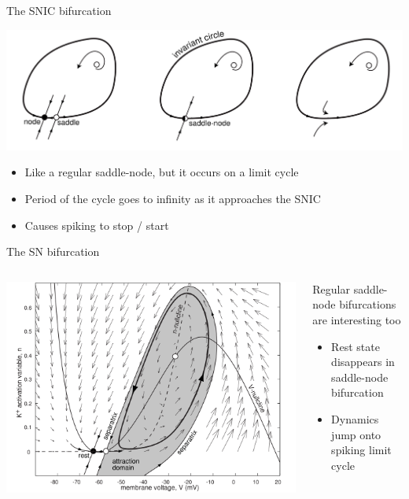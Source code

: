 \documentclass[presentation]{beamer}
\begin{document}
\begin{frame}[label={sec:org8d13461}]{The SNIC bifurcation}
\begin{center}
\includegraphics[width=\textwidth]{./snic.png}
\end{center}

\begin{itemize}
\item Like a regular saddle-node, but it occurs on a limit cycle
\item Period of the cycle goes to infinity as it approaches the SNIC
\item Causes spiking to stop / start
\end{itemize}
\end{frame}
\begin{frame}[label={sec:orgcf2465c}]{The SN bifurcation}
\begin{columns}
\begin{column}{0.5\columnwidth}
\begin{center}
\includegraphics[width=\textwidth]{./SN.png}
\end{center}
\end{column}

\begin{column}{0.5\columnwidth}
Regular saddle-node bifurcations are interesting too

\begin{itemize}
\item Rest state disappears in saddle-node bifurcation
\item Dynamics jump onto spiking limit cycle
\end{itemize}
\end{column}
\end{columns}
\end{frame}
\end{document}
